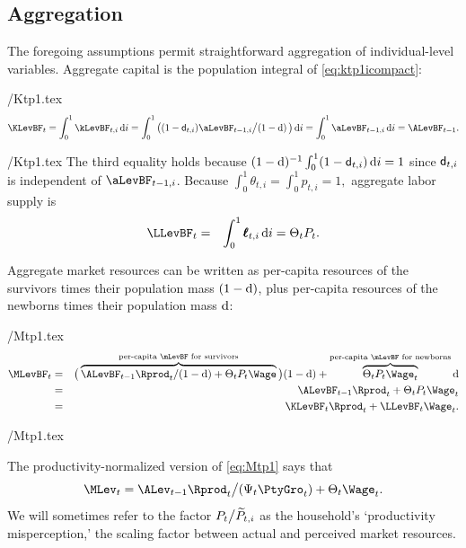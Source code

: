 \documentclass[titlepage]{\econtex}
\begin{document}
\subsection{Aggregation}

The foregoing assumptions permit straightforward aggregation of individual-level variables.  Aggregate capital is the population integral of \eqref{eq:ktp1icompact}:
\begin{verbatimwrite}{\eq/Ktp1.tex}
\begin{equation}
\KLevBF_{t} = \int_{0}^{1} \kLevBF_{t,i}\,\text{d}i = \int_{0}^{1} \big((1 - \pDies_{t,i})\aLevBF_{t-1,i} \big/\PLives\, \big)\,\text{d}i = \int_{0}^{1} \aLevBF_{t-1,i}\,\text{d}i = \ALevBF_{t-1}.   \label{eq:Ktp1}
\end{equation}
\end{verbatimwrite}
 \eq/Ktp1.tex
The third equality holds because $(1-\mathrm{d})^{-1}\int_{0}^{1}(1-\mathsf{d}_{t,i})\,\text{d}i = 1$
since $\mathsf{d}_{t,i}$ is independent of $\aLevBF_{t-1,i}$.
Because $\int_{0}^{1} \theta_{t,i} = \int_{0}^{1} {p}_{t,i} = 1,$ aggregate labor supply
is
\begin{eqnarray}
  \label{eq:Lt}
  \LLevBF_{t} & = & \int_{0}^{1} \pmb{\ell}_{t,i}\,\text{d}i = \Theta_{t} {P}_{t}.
\end{eqnarray}

Aggregate market resources can be written as per-capita resources of the survivors times their population mass $(1-\mathrm{d})$, plus per-capita resources of the newborns times their population mass $\mathrm{d}$:
\begin{verbatimwrite}{\eq/Mtp1.tex}
\begin{eqnarray}
  \MLevBF_{t} & = & \big(\overbrace{\ALevBF_{t-1} {\Rprod}_t/\PLives  + \Theta_{t} {P}_{t}\Wage}^{\text{per-capita $\mLevBF$ for survivors}}\big)\PLives+\overbrace{\Theta_{t} {P}_{t}\Wage_t}^{\text{per-capita $\mLevBF$ for newborns}} \PDies \nonumber \\
                       & = & \ALevBF_{t-1} {\Rprod}_t + \Theta_{t} P_t \Wage_t  \label{eq:Mtp1} \\
                       & = & \KLevBF_t \Rprod_t + \LLevBF_t \Wage_t. \nonumber
\end{eqnarray}
\end{verbatimwrite}
 \eq/Mtp1.tex


The productivity-normalized version of \eqref{eq:Mtp1} says that
\begin{equation}\label{eq:Mtp1norm}
\MLev_t = \ALev_{t-1} \Rprod_t\big/(\Psi_t \PtyGro_t) + \Theta_t \Wage_t.
\end{equation}
We will sometimes refer to the factor $P_t\big/\widetilde{P}_{t,i}$ as the household's `productivity misperception,' the scaling factor between actual and perceived market resources.
\end{document}
